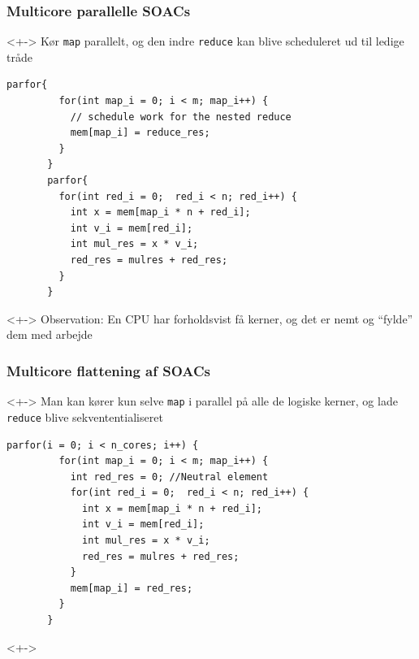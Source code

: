 \documentclass[t]{beamer}
\begin{document}
\begin{frame}[fragile]
  \frametitle{Multicore parallelle SOACs}
  \begin{onlyenv}<+->
    Kør \texttt{map} parallelt, og den indre \texttt{reduce} kan blive scheduleret ud til ledige tråde
\begin{lstlisting}[language=ispc, xleftmargin=-15mm]
       parfor{
         for(int map_i = 0; i < m; map_i++) {
           // schedule work for the nested reduce
           mem[map_i] = reduce_res;
         }
       }
       parfor{
         for(int red_i = 0;  red_i < n; red_i++) {
           int x = mem[map_i * n + red_i];
           int v_i = mem[red_i];
           int mul_res = x * v_i;
           red_res = mulres + red_res;
         }
       }
\end{lstlisting}
  \end{onlyenv}
  \begin{onlyenv}<+->
    Observation: En CPU har forholdsvist få kerner, og det er nemt og ``fylde'' dem med arbejde
  \end{onlyenv}
\end{frame}

\begin{frame}[fragile]
  \frametitle{Multicore flattening af SOACs}
  \begin{onlyenv}<+->
    Man kan kører kun selve \texttt{map} i parallel på alle de logiske kerner, og lade \texttt{reduce} blive sekvententialiseret
\begin{lstlisting}[language=ispc, xleftmargin=-15mm]
       parfor(i = 0; i < n_cores; i++) {
         for(int map_i = 0; i < m; map_i++) {
           int red_res = 0; //Neutral element
           for(int red_i = 0;  red_i < n; red_i++) {
             int x = mem[map_i * n + red_i];
             int v_i = mem[red_i];
             int mul_res = x * v_i;
             red_res = mulres + red_res;
           }
           mem[map_i] = red_res;
         }
       }
\end{lstlisting}
  \end{onlyenv}
  <+->
\end{frame}
\end{document}

